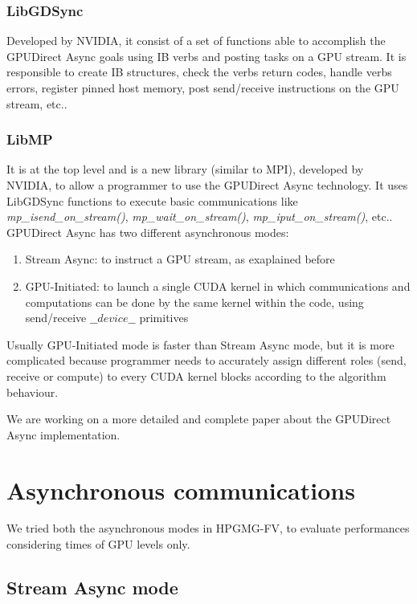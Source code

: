 \documentclass[conference]{IEEEtran}
\begin{document}
\subsubsection{LibGDSync}
Developed by NVIDIA, it consist of a set of functions able to accomplish the GPUDirect Async goals using IB verbs and posting tasks on a GPU stream. It is responsible to create IB structures, check the verbs return codes, handle verbs errors, register pinned host memory, post send/receive instructions on the GPU stream, etc..

\subsubsection{LibMP}
It is at the top level and is a new library (similar to MPI), developed by NVIDIA, to allow a programmer to use the GPUDirect Async technology.
It uses LibGDSync functions to execute basic communications like \textit{mp\_isend\_on\_stream()}, \textit{mp\_wait\_on\_stream()}, \textit{mp\_iput\_on\_stream()}, etc.. 
\\

GPUDirect Async has two different asynchronous modes:
\begin{enumerate}
\item Stream Async: to instruct a GPU stream, as exaplained before
\item GPU-Initiated: to launch a single CUDA kernel in which communications and computations can be done by the same kernel within the code, using send/receive $\_\_device\_\_$ primitives\\
\end{enumerate}

Usually GPU-Initiated mode is faster than Stream Async mode, but it is more complicated because programmer needs to accurately assign different roles (send, receive or compute) to every CUDA kernel blocks according to the algorithm behaviour.

We are working on a more detailed and complete paper about the GPUDirect Async implementation.


\section{Asynchronous communications}\label{sec:gpudirect_async_hpgmg}

We tried both the asynchronous modes in HPGMG-FV, to evaluate performances considering times of GPU levels only.

\subsection{Stream Async mode}
\end{document}
